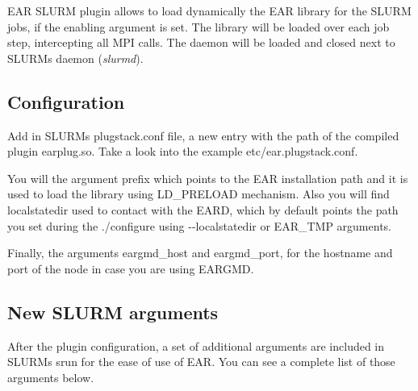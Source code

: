 E\+AR S\+L\+U\+RM plugin allows to load dynamically the E\+AR library for the S\+L\+U\+RM jobs, if the enabling argument is set. The library will be loaded over each job step, intercepting all M\+PI calls. The daemon will be loaded and closed next to S\+L\+U\+RM\textquotesingle{}s daemon ({\itshape slurmd}).

\subsection*{Configuration }

Add in S\+L\+U\+RM\textquotesingle{}s {\ttfamily plugstack.\+conf} file, a new entry with the path of the compiled plugin {\ttfamily earplug.\+so}. Take a look into the example {\ttfamily etc/ear.\+plugstack.\+conf}.

You will the argument {\ttfamily prefix} which points to the E\+AR installation path and it is used to load the library using {\ttfamily L\+D\+\_\+\+P\+R\+E\+L\+O\+AD} mechanism. Also you will find {\ttfamily localstatedir} used to contact with the E\+A\+RD, which by default points the path you set during the {\ttfamily ./configure} using {\ttfamily -\/-\/localstatedir} or {\ttfamily E\+A\+R\+\_\+\+T\+MP} arguments.

Finally, the arguments {\ttfamily eargmd\+\_\+host} and {\ttfamily eargmd\+\_\+port}, for the hostname and port of the node in case you are using E\+A\+R\+G\+MD.

\subsection*{New S\+L\+U\+RM arguments }

After the plugin configuration, a set of additional arguments are included in S\+L\+U\+RM\textquotesingle{}s {\ttfamily srun} for the ease of use of E\+AR. You can see a complete list of those arguments below.

